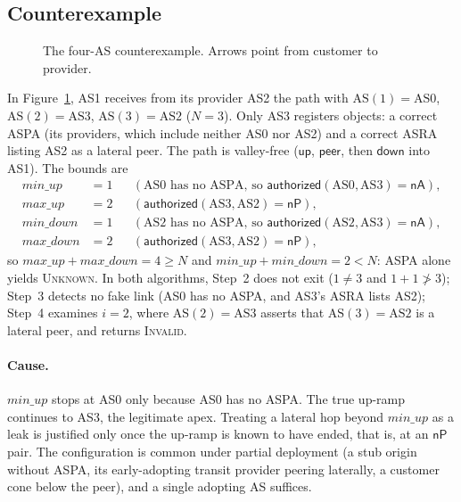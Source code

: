 \documentclass[11pt,a4paper]{article}
\theoremstyle{definition}
\theoremstyle{remark}
\newcommand{\AS}{\mathrm{AS}}
\newcommand{\auth}{\mathsf{authorized}}
\newcommand{\nP}{\mathsf{nP}}     %
\newcommand{\nA}{\mathsf{nA}}     %
\newcommand{\up}{\mathsf{up}}
\newcommand{\down}{\mathsf{down}}
\newcommand{\peer}{\mathsf{peer}}
\newcommand{\Invalid}{\textup{\textsc{Invalid}}}
\newcommand{\Unknown}{\textup{\textsc{Unknown}}}
\newcommand{\maxup}{\mathit{max\_up}}
\newcommand{\minup}{\mathit{min\_up}}
\newcommand{\maxdown}{\mathit{max\_down}}
\newcommand{\mindown}{\mathit{min\_down}}
\begin{document}
\subsection{Counterexample}
\begin{figure}[ht]
\centering
{}
\caption{The four-AS counterexample. Arrows point from customer to provider.}
\label{fig:cex}
\end{figure}

In Figure~\ref{fig:cex}, AS1 receives from its provider AS2 the path with $\AS(1)=\text{AS0}$,
$\AS(2)=\text{AS3}$, $\AS(3)=\text{AS2}$ ($N=3$). Only AS3 registers objects: a correct ASPA (its providers,
which include neither AS0 nor AS2) and a correct ASRA listing AS2 as a lateral peer. The path is
valley-free ($\up$, $\peer$, then $\down$ into AS1). The bounds are
\begin{align*}
  \minup&=1 &&(\text{AS0 has no ASPA, so }\auth(\text{AS0},\text{AS3})=\nA),\\
  \maxup&=2 &&(\auth(\text{AS3},\text{AS2})=\nP),\\
  \mindown&=1 &&(\text{AS2 has no ASPA, so }\auth(\text{AS2},\text{AS3})=\nA),\\
  \maxdown&=2 &&(\auth(\text{AS3},\text{AS2})=\nP),
\end{align*}
so $\maxup+\maxdown=4\ge N$ and $\minup+\mindown=2<N$: ASPA alone yields \Unknown. In both algorithms,
Step~2 does not exit ($1\neq3$ and $1+1\not>3$); Step~3 detects no fake link (AS0 has no ASPA, and AS3's
ASRA lists AS2); Step~4 examines $i=2$, where $\AS(2)=\text{AS3}$ asserts that $\AS(3)=\text{AS2}$ is a
lateral peer, and returns \Invalid.

\paragraph{Cause.}
$\minup$ stops at AS0 only because AS0 has no ASPA. The true up-ramp continues to AS3, the legitimate apex.
Treating a lateral hop beyond $\minup$ as a leak is justified only once the up-ramp is known to have ended,
that is, at an $\nP$ pair. The configuration is common under partial deployment (a stub origin without
ASPA, its early-adopting transit provider peering laterally, a customer cone below the peer), and a single
adopting AS suffices.
\end{document}
